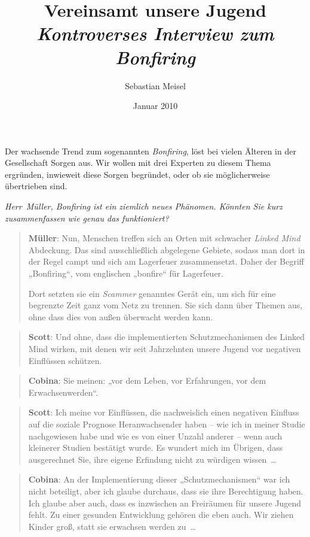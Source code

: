 \documentclass{scrartcl}
\author{Sebastian Meisel}
\date{Januar 2010}
\title{Vereinsamt unsere Jugend\\
\emph{Kontroverses Interview zum Bonfiring} \\}
\newenvironment{frage}{\itshape}{}
\newenvironment{antworta}{
  \begin{quotation}
  }{
  \end{quotation}
}
\newenvironment{antwortb}{
  \begin{quotation}
  }{
  \end{quotation}
}
\newcommand{\name}[1]{\textbf{#1}}
\begin{document}
\maketitle


{Der wachsende Trend zum sogenannten \emph{Bonfiring}, löst bei
vielen Älteren in der Gesellschaft Sorgen aus. Wir wollen
mit drei Experten zu diesem Thema ergründen, inwieweit diese
Sorgen begründet, oder ob sie möglicherweise übertrieben sind.\\}

\begin{frage}
Herr~Müller, Bonfiring ist ein ziemlich neues
Phänomen. Könnten Sie kurz zusammenfassen wie genau das
funktioniert?
\end{frage}


\begin{antworta}
\name{Müller}: Nun, Menschen treffen sich an Orten mit schwacher
\emph{Linked Mind} Abdeckung. Das sind ausschließlich
abgelegene Gebiete, sodass man dort in der Regel campt
und sich am Lagerfeuer zusammensetzt. Daher der Begriff
„Bonfiring“, vom englischen „bonfire“ für Lagerfeuer.

Dort setzten sie ein \emph{Scammer} genanntes Gerät ein, um sich
für eine begrenzte Zeit ganz vom Netz zu trennen. Sie sich
dann über Themen aus, ohne dass dies von außen überwacht
werden kann.
\end{antworta}


\begin{antwortb}
\name{Scott}: Und ohne, dass die implementierten Schutzmechanismen
des Linked Mind wirken, mit denen wir seit Jahrzehnten
unsere Jugend vor negativen Einflüssen schützen.
\end{antwortb}


\begin{antworta}
\name{Cobina}: Sie meinen: „vor dem Leben, vor Erfahrungen,
vor dem Erwachsenwerden“.
\end{antworta}


\begin{antwortb}
\name{Scott}: Ich meine vor Einflüssen, die nachweislich einen
negativen Einfluss auf die soziale Prognose
Heranwachsender haben – wie ich in meiner Studie
nachgewiesen habe und wie es von einer Unzahl anderer –
wenn auch kleinerer Studien bestätigt wurde. Es wundert
mich im Übrigen, dass ausgerechnet Sie, ihre eigene
Erfindung nicht zu würdigen wissen~…
\end{antwortb}


\begin{antworta}
\name{Cobina}: An der Implementierung dieser
„Schutzmechanismen“ war ich nicht beteiligt, aber ich
glaube durchaus, dass sie ihre Berechtigung haben. Ich
glaube aber auch, dass es inzwischen an Freiräumen für
unsere Jugend fehlt. Zu einer gesunden Entwicklung
gehören die eben auch. Wir ziehen Kinder groß, statt sie
erwachsen werden zu~…
\end{antworta}
\end{document}
